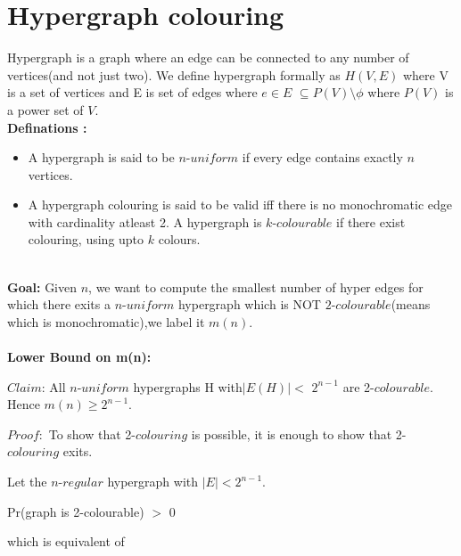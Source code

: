 \documentclass{article}
\begin{document}
\section{Hypergraph colouring}
\par

Hypergraph is a graph where an edge can be connected to any number of vertices(and not just two). We define hypergraph formally as 
     $H(V,E)$ where V is a set of vertices and E is set of edges where $e\in E$ $\subseteq P(V)\setminus \phi$ where $P(V)$ is a power set of $V$. \\
     
\textbf {Definations : }

\begin{itemize}
  \item A hypergraph is said to be $n$-$uniform$ if every edge contains exactly $n$ vertices.
  \item A hypergraph colouring is said to be valid  iff there is no  monochromatic edge with cardinality atleast 2. A hypergraph is $k$-$colourable$ if there exist colouring, using upto $k$ colours.   
  \end{itemize}
\\
\textbf{Goal: }
Given $n$, we want to compute the smallest number of hyper edges
for which there exits a $n$-$uniform$ hypergraph which is NOT $2$-$colourable$(means which is monochromatic),we label it $m(n)$.
\\
\\

\textbf{Lower Bound on m(n): }

$Claim$: All $n$-$uniform$ hypergraphs H with$|E(H)|$$<$ $2^{n-1}$ are 2-$colourable$. Hence $m(n) \geq 2^{n-1}$.

$Proof :$  To show that 2-$colouring$ is possible, it is enough to show that 2-$colouring$ exits.

Let the $n$-$regular$ hypergraph with $|E|<2^{n-1}$.\\

\begin{centering}
\vspace{5mm}
Pr(graph is 2-colourable) $>$ 0 \\
\end{centering}

which is equivalent of
\end{document}
